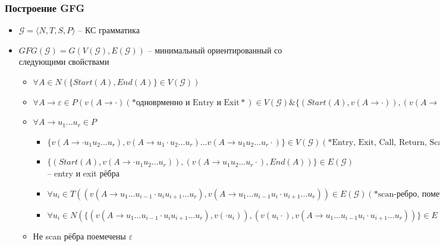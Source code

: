 \documentclass{beamer}
\begin{document}
\begin{frame}
    \transwipe[direction=90]
    \frametitle{Построение GFG}
    \begin{itemize}
        \item $\mathcal{G} = \langle N, T, S, P \rangle$ -- КС грамматика
        \item $GFG(\mathcal{G}) = G(V(\mathcal{G}),E(\mathcal{G}))$ -- минимальный ориентированный со следующими свойствами
        \begin{itemize}
            \item $\forall A \in N (\{ Start(A), End(A) \} \in V (\mathcal{G}))$
            \item $\forall A \rightarrow \varepsilon \in P ( v(A \rightarrow \cdot)  (*\text{одноврменно и Entry и Exit}*) \in V (\mathcal{G}) \& \{ (Start(A),v(A \rightarrow \cdot)),(v(A \rightarrow \cdot), End(A))  \} \in E(\mathcal{G}) )$ 
            \item $\forall A \rightarrow u_1 ... u_r \in P$
            \begin{itemize}
                \item $\{ v(A \rightarrow \cdot u_1 u_2 ... u_r),v(A \rightarrow u_1 \cdot u_2 ... u_r) ... v(A \rightarrow u_1 u_2 ... u_r \cdot)\} \in V(\mathcal{G}) (*\text{Entry, Exit, Call, Return, Scan вершины. Всего r+1 штука}*)$
                \item $\{ (Start(A),v(A \rightarrow \cdot u_1 u_2 ... u_r)),(v(A \rightarrow u_1 u_2 ... u_r \cdot), End(A))  \} \in E(\mathcal{G})$ -- entry и exit рёбра
                \item $\forall u_i \in T (( v(A \rightarrow u_1 ... u_{i-1} \cdot u_i u_{i+1} ... u_r) , v(A \rightarrow u_1 ... u_{i-1} u_i \cdot u_{i+1} ... u_r)) \in E(\mathcal{G}) (*\text{scan-ребро, помечено } u_i*) )$
                \item $\forall u_i \in N (\{(v(A \rightarrow u_1 ... u_{i-1} \cdot u_i u_{i+1} ... u_r) , v(\cdot u_i)), (v(u_i \cdot ),v(A \rightarrow u_1 ... u_{i-1}u_i \cdot u_{i+1} ... u_r)) \} \in E(\mathcal{G}) (*\text{call, return рёбра}*))$
            \end{itemize}    
            \item Не scan рёбра поемечены $\varepsilon$
        \end{itemize}
    \end{itemize}
\end{frame}
\end{document}
